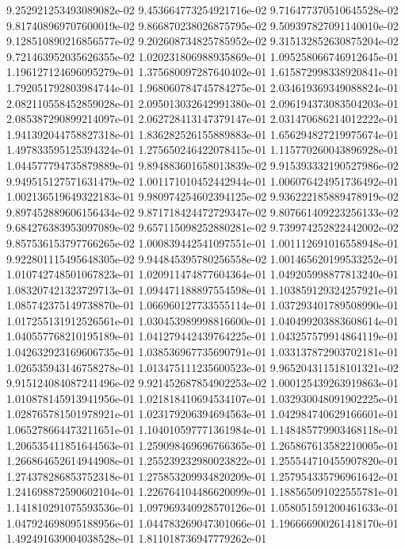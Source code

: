 9.252921253493089082e-02
9.453664773254921716e-02
9.716477370510645528e-02
9.817408969707600019e-02
9.866870238026875795e-02
9.509397827091140010e-02
9.128510890216856577e-02
9.202608734825785952e-02
9.315132852630875204e-02
9.721463952035626355e-02
1.020231806988935869e-01
1.095258066746912645e-01
1.196127124696095279e-01
1.375680097287640402e-01
1.615872998338920841e-01
1.792051792803984744e-01
1.968060784745784275e-01
2.034619369349088824e-01
2.082110558452859028e-01
2.095013032642991380e-01
2.096194373083504203e-01
2.085387290899214097e-01
2.062728413147379147e-01
2.031470686214012222e-01
1.941392044758827318e-01
1.836282526155889883e-01
1.656294827219975674e-01
1.497833595125394324e-01
1.275650246422078415e-01
1.115770260043896928e-01
1.044577794735879889e-01
9.894883601658013839e-02
9.915393332190527986e-02
9.949515127571631479e-02
1.001171010452442944e-01
1.006076424951736492e-01
1.002136519649322183e-01
9.980974254602394125e-02
9.936222185889478919e-02
9.897452889606156434e-02
9.871718424472729347e-02
9.807661409223256133e-02
9.684276383953097089e-02
9.657115098252880281e-02
9.739974252822442002e-02
9.857536153797766265e-02
1.000839442541097551e-01
1.001112691016558948e-01
9.922801115495648305e-02
9.944845395780256558e-02
1.001465620199533252e-01
1.010742748501067823e-01
1.020911474877604364e-01
1.049205998877813240e-01
1.083207421323729713e-01
1.094471188897554598e-01
1.103859129324257921e-01
1.085742375149738870e-01
1.066960127733555114e-01
1.037293401789508990e-01
1.017255131912526561e-01
1.030453989998816600e-01
1.040499203883608614e-01
1.040557768210195189e-01
1.041279442439764225e-01
1.043257579914864119e-01
1.042632923169606735e-01
1.038536967735690791e-01
1.033137872903702181e-01
1.026535943146758278e-01
1.013475111235600523e-01
9.965204311518101321e-02
9.915124084087241496e-02
9.921452687854902253e-02
1.000125439263919863e-01
1.010878145913941956e-01
1.021818410694534107e-01
1.032930048091902225e-01
1.028765781501978921e-01
1.023179206394694563e-01
1.042984740629166601e-01
1.065278664473211651e-01
1.104010597771361984e-01
1.148485779903468118e-01
1.206535411851644563e-01
1.259098469696766365e-01
1.265867613582210005e-01
1.266864652614944908e-01
1.255239232980023822e-01
1.255544710455907820e-01
1.274378286853752318e-01
1.275853209934820209e-01
1.257954335796961642e-01
1.241698872590602104e-01
1.226764104486620099e-01
1.188565091022555781e-01
1.141810291075593536e-01
1.097969340928570126e-01
1.058051591200461633e-01
1.047924698095188956e-01
1.044783269047301066e-01
1.196666900261418170e-01
1.492491639004038528e-01
1.811018736947779262e-01
